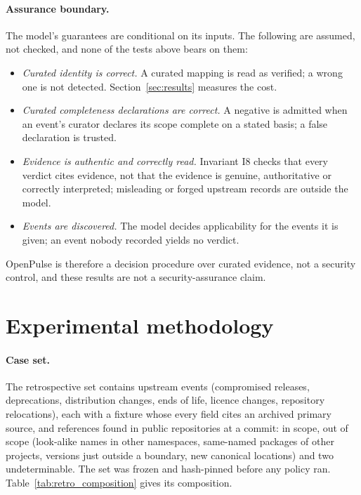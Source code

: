 \documentclass[11pt]{article}
\begin{document}
\paragraph{Assurance boundary.} The model's guarantees are conditional on its
inputs. The following are assumed, not checked, and none of the tests above
bears on them:
\begin{itemize}[nosep]
  \item \emph{Curated identity is correct.} A curated mapping is read as
  verified; a wrong one is not detected. Section~\ref{sec:results} measures
  the cost.
  \item \emph{Curated completeness declarations are correct.} A negative is
  admitted when an event's curator declares its scope complete on a stated
  basis; a false declaration is trusted.
  \item \emph{Evidence is authentic and correctly read.} Invariant I8 checks
  that every verdict cites evidence, not that the evidence is genuine,
  authoritative or correctly interpreted; misleading or forged upstream
  records are outside the model.
  \item \emph{Events are discovered.} The model decides applicability for the
  events it is given; an event nobody recorded yields no verdict.
\end{itemize}
OpenPulse is therefore a decision procedure over curated evidence, not a
security control, and these results are not a security-assurance claim.

\section{Experimental methodology}
\label{sec:method}

\paragraph{Case set.} The retrospective set contains \RetroEvents{} upstream
events (compromised releases, deprecations, distribution changes, ends of
life, licence changes, repository relocations), each with a fixture whose
every field cites an archived primary source, and \RetroPairs{} references
found in public repositories at a commit: \RetroInScope{} in scope,
\RetroOutScope{} out of scope (look-alike names in other namespaces,
same-named packages of other projects, versions just outside a boundary, new
canonical locations) and two undeterminable. The set was frozen and
hash-pinned before any policy ran. Table~\ref{tab:retro_composition} gives its
composition.
\end{document}
